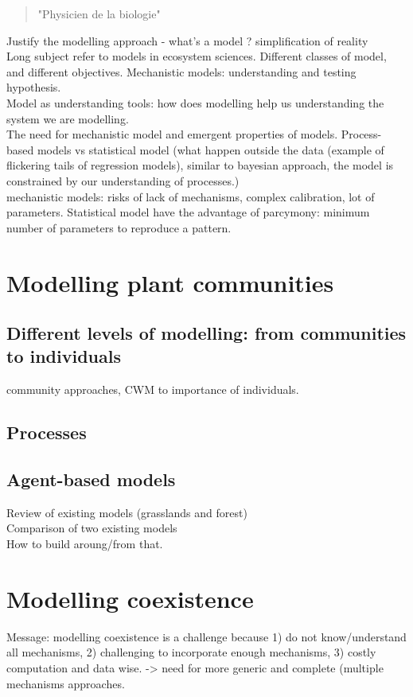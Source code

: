 \begin{quote}
"Physicien de la biologie"
\end{quote}
Justify the modelling approach - what's a model ? simplification of reality\\
Long subject refer to models in ecosystem sciences. Different classes of model, and different objectives. Mechanistic models: understanding and testing hypothesis.\\
Model as understanding tools: how does modelling help us understanding the system we are modelling.\\
The need for mechanistic model and emergent properties of models. Process-based models vs statistical model (what happen outside the data (example of flickering tails of regression models), similar to bayesian approach, the model is constrained by our understanding of processes.) \\
mechanistic models: risks of lack of mechanisms, complex calibration, lot of parameters. Statistical model have the advantage of parcymony: minimum number of parameters to reproduce a pattern.

\section{Modelling plant communities}

\subsection{Different levels of modelling: from communities to individuals}
community approaches, CWM to importance of individuals.\\


\subsection{Processes}

\subsection{Agent-based models}

Review of existing models (grasslands and forest)\\
Comparison of two existing models\\
How to build aroung/from that.\\


\section{Modelling coexistence}
Message: modelling coexistence is a challenge because 1) do not know/understand all mechanisms, 2) challenging to incorporate enough mechanisms, 3) costly computation and data wise. -> need for more generic and complete (multiple mechanisms approaches.

